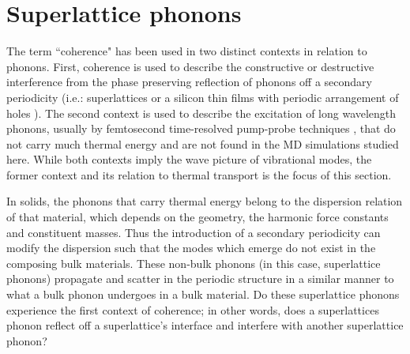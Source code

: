 \begin{comment}
The noise in the contribution distribution at longer MFPs is consequence of the limited resolution of the BZ enforced by the MD domain. This has been observed in other mode by mode analysis techniques, such as the real space force constant extraction from DFT method used by Esfarjani, where the limited resolution manifested in a stepwise behavior of thermal conductivity accumulation function of bulk silicon. \cite{PhysRevB.84.085204} The linear behavior of the dispersion near the gamma point of the BZ and the $\omega^{-2}$ scaling of the lifetimes allowed for the contribution of these unresolved long-wavelength modes to be estimated. The linear extrapolation procedure used to predict bulk thermal conductivities \cite{PhysRevB.81.214305} was not used in previous superlattice studies \cite{doi:10.1021/nl202186y,Luckyanova16112012} and is not used here. The complicated dispersion [Fig.~\ref{fig:dispersion}(a-c)] does not guarantee that such an approach is viable, as such, understanding size effects in superlattices warrants further work.
\end{comment}

\section{Superlattice phonons}\label{SEC:sl_phon}

The term ``coherence" has been used in two distinct contexts in relation to phonons. First, coherence is used to describe the constructive or destructive interference from the phase preserving reflection of phonons off a secondary periodicity (i.e.: superlattices or a silicon thin films with periodic arrangement of holes \cite{doi:10.1021/nl102918q}). The second context is used to describe the excitation of long wavelength phonons, usually by femtosecond time-resolved pump-probe techniques \cite{PhysRevLett.73.740,PhysRevB.75.195309}, that do not carry much thermal energy and are not found in the MD simulations studied here. While both contexts imply the wave picture of vibrational modes, the former context and its relation to thermal transport is the focus of this section.

In solids, the phonons that carry thermal energy belong to the dispersion relation of that material, which depends on the geometry, the harmonic force constants and constituent masses. Thus the introduction of a secondary periodicity can modify the dispersion such that the modes which emerge do not exist in the composing bulk materials. These non-bulk phonons (in this case, superlattice phonons) propagate and scatter in the periodic structure in a similar manner to what a bulk phonon undergoes in a bulk material. Do these superlattice phonons experience the first context of coherence; in other words, does a superlattices phonon reflect off a superlattice's interface and interfere with another superlattice phonon?%

